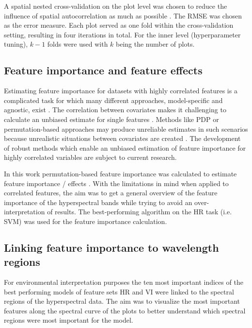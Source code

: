 \documentclass[peerreview]{IEEEtran}
\begin{document}
A spatial nested cross-validation on the plot level was chosen to reduce the influence of spatial autocorrelation as much as possible \cite{schratz2019, sperrorest}.
The \ac{RMSE} was chosen as the error measure.
Each plot served as one fold within the cross-validation setting, resulting in four iterations in total.
For the inner level (hyperparameter tuning), \(k - 1\) folds were used with \(k\) being the number of plots.

\subsection{Feature importance and feature effects}

Estimating feature importance for datasets with highly correlated features is a complicated task for which many different approaches, model-specific and agnostic, exist \cite{friedman2001, hastie2001, greenwell2018}.
The correlation between covariates makes it challenging to calculate an unbiased estimate for single features \cite{molnar2019}.
Methods like \ac{PDP} or permutation-based approaches may produce unreliable estimates in such scenarios because unrealistic situations between covariates are created \cite{molnar2019}.
The development of robust methods which enable an unbiased estimation of feature importance for highly correlated variables are subject to current research.

In this work permutation-based feature importance was calculated to estimate feature importance / effects \cite{apley2019}.
With the limitations in mind when applied to correlated features, the aim was to get a general overview of the feature importance of the hyperspectral bands while trying to avoid an over-interpretation of results.
The best-performing algorithm on the HR task (i.e. SVM) was used for the feature importance calculation.

\subsection{Linking feature importance to wavelength regions}

For environmental interpretation purposes the ten most important indices of the best performing models of feature sets HR and VI were linked to the spectral regions of the hyperspectral data.
The aim was to visualize the most important features along the spectral curve of the plots to better understand which spectral regions were most important for the model.
\end{document}
